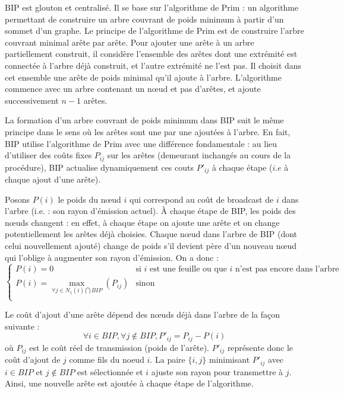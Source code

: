 BIP est glouton et centralisé. Il se base sur l'algorithme de Prim \cite{Prim1957} : un algorithme permettant de construire un arbre couvrant de poids minimum à partir d'un sommet d'un graphe. Le principe de l'algorithme de Prim est de construire l'arbre couvrant minimal arête par arête. Pour ajouter une arête à un arbre partiellement construit, il considère l'ensemble des arêtes dont une extrémité est connectée à l'arbre déjà construit, et l'autre extrémité ne l'est pas. Il choisit dans cet ensemble une arête de poids minimal qu'il ajoute à l'arbre. L'algorithme commence avec un arbre contenant un nœud et pas d'arêtes, et ajoute successivement $n-1$ arêtes.

La formation d'un arbre couvrant de poids minimum dans BIP suit le même principe dans le sens où les arêtes sont une par une ajoutées à l'arbre. En fait, BIP utilise l'algorithme de Prim avec une différence fondamentale : au lieu d'utiliser des coûts fixes $P_{ij}$ sur les arêtes (demeurant inchangés au cours de la procédure), BIP actualise dynamiquement ces couts $P'_{ij}$ à chaque étape ($i.e$ à chaque ajout d'une arête).

Posons $P(i)$ le poids du nœud $i$ qui correspond au coût de broadcast de $i$ dans l'arbre (i.e. : son rayon d'émission actuel). À chaque étape de BIP, les poids des nœuds changent : en effet, à chaque étape on ajoute une arête et on change potentiellement les arêtes déjà choisies. Chaque nœud dans l'arbre de BIP (dont celui nouvellement ajouté) change de poids s'il devient père d'un nouveau nœud qui l'oblige à augmenter son rayon d'émission. On a donc :
$$\begin{cases}
	P(i)=0  & \text{si $i$ est une feuille ou que $i$ n'est pas encore dans l'arbre}\\
	P(i)=\max\limits_{\forall j\in N_1(i)\bigcap BIP}(P_{ij}) & \text{sinon}\\
\end{cases}$$

Le coût d'ajout d'une arête dépend des nœuds déjà dans l'arbre de la façon suivante : 
$$ \forall i \in BIP, \forall j \notin BIP, P'_{ij}=P_{ij}-P(i)$$
où $P_{ij}$ est le coût réel de transmission (poids de l'arête). $P'_{ij}$ représente donc le coût d'ajout de $j$ comme fils du noeud $i$. La paire $\{i,j\}$ minimisant $P'_{ij}$ avec $i \in BIP$ et $j \not\in BIP$ est sélectionnée et $i$ ajuste son rayon pour transmettre à $j$. Ainsi, une nouvelle arête est ajoutée à chaque étape de l'algorithme.\\


